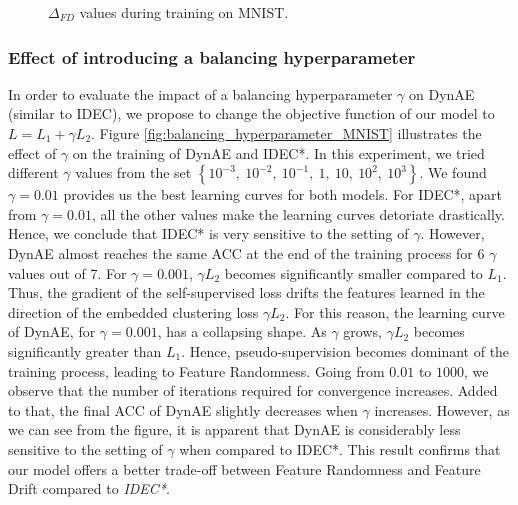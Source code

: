 \documentclass{article}
\begin{document}
\begin{figure*}[ht]
\vskip 0.2in
\centering
    \caption{$\Delta_{FD}$ values during training on MNIST.}
\label{fig:Delta_FD_MNIST}
\end{figure*}







\subsubsection{Effect of introducing a balancing hyperparameter}
\label{Sec:Balancing hyperparameter}
In order to evaluate the impact of a balancing hyperparameter $\gamma$ on DynAE (similar to IDEC), we propose to change the objective function of our model to $L = L_{1} + \gamma L_{2}$. Figure \ref{fig:balancing_hyperparameter_MNIST} illustrates the effect of $\gamma$ on the training of DynAE and IDEC*. In this experiment, we tried different $\gamma$ values from the set $\left\{ 10^{-3}, \: 10^{-2}, \: 10^{-1}, \: 1, \: 10, \: 10^{2}, \: 10^{3}\right\}$. We found $\gamma = 0.01$ provides us the best learning curves for both models. For IDEC*, apart from  $\gamma = 0.01$, all the other values make the learning curves detoriate drastically. Hence, we conclude that IDEC* is very sensitive to the setting of $\gamma$. However, DynAE almost reaches the same ACC at the end of the training process for 6 $\gamma$ values out of 7.
For $\gamma = 0.001$, $\gamma L_{2}$ becomes significantly smaller compared to $L_{1}$. Thus, the gradient of the self-supervised loss  drifts the features learned in the direction of the embedded clustering loss $\gamma L_{2}$. For this reason, the learning curve of DynAE, for $\gamma = 0.001$, has a collapsing shape. As $\gamma$ grows, $\gamma L_{2}$ becomes significantly greater than $L_{1}$. Hence, pseudo-supervision becomes dominant of the training process, leading to Feature Randomness. Going from $0.01$ to $1000$, we observe that the number of iterations required for convergence increases. Added to that, the final ACC of DynAE slightly decreases when $\gamma$ increases. However, as we can see from the figure, it is apparent that DynAE is considerably less sensitive to the setting of $\gamma$ when compared to IDEC*. This result confirms that our model offers a better trade-off between Feature Randomness and Feature Drift compared to \textit{IDEC*}.
 
\end{document}
